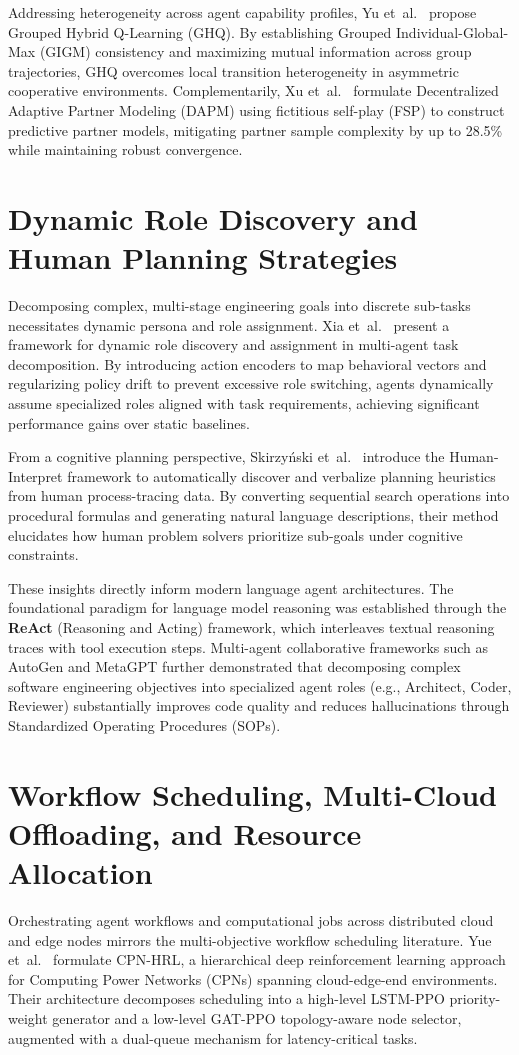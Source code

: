 \documentclass[12pt,a4paper]{report}
\begin{document}
Addressing heterogeneity across agent capability profiles, Yu et~al.~\cite{ref_yu2024_ghq} propose Grouped Hybrid Q-Learning (GHQ). By establishing Grouped Individual-Global-Max (GIGM) consistency and maximizing mutual information across group trajectories, GHQ overcomes local transition heterogeneity in asymmetric cooperative environments. Complementarily, Xu et~al.~\cite{ref_xu2024_dapm} formulate Decentralized Adaptive Partner Modeling (DAPM) using fictitious self-play (FSP) to construct predictive partner models, mitigating partner sample complexity by up to 28.5\% while maintaining robust convergence.

\section{Dynamic Role Discovery and Human Planning Strategies}
Decomposing complex, multi-stage engineering goals into discrete sub-tasks necessitates dynamic persona and role assignment. Xia et~al.~\cite{ref_xia2023_dynamic_roles} present a framework for dynamic role discovery and assignment in multi-agent task decomposition. By introducing action encoders to map behavioral vectors and regularizing policy drift to prevent excessive role switching, agents dynamically assume specialized roles aligned with task requirements, achieving significant performance gains over static baselines.

From a cognitive planning perspective, Skirzy\'nski et~al.~\cite{ref_skirzynski2024_humanplanning} introduce the Human-Interpret framework to automatically discover and verbalize planning heuristics from human process-tracing data. By converting sequential search operations into procedural formulas and generating natural language descriptions, their method elucidates how human problem solvers prioritize sub-goals under cognitive constraints.

These insights directly inform modern language agent architectures. The foundational paradigm for language model reasoning was established through the \textbf{ReAct} (Reasoning and Acting) framework, which interleaves textual reasoning traces with tool execution steps. Multi-agent collaborative frameworks such as AutoGen and MetaGPT further demonstrated that decomposing complex software engineering objectives into specialized agent roles (e.g., Architect, Coder, Reviewer) substantially improves code quality and reduces hallucinations through Standardized Operating Procedures (SOPs).

\section{Workflow Scheduling, Multi-Cloud Offloading, and Resource Allocation}
Orchestrating agent workflows and computational jobs across distributed cloud and edge nodes mirrors the multi-objective workflow scheduling literature. Yue et~al.~\cite{ref_yue2026_cpnhrl} formulate CPN-HRL, a hierarchical deep reinforcement learning approach for Computing Power Networks (CPNs) spanning cloud-edge-end environments. Their architecture decomposes scheduling into a high-level LSTM-PPO priority-weight generator and a low-level GAT-PPO topology-aware node selector, augmented with a dual-queue mechanism for latency-critical tasks.
\end{document}
